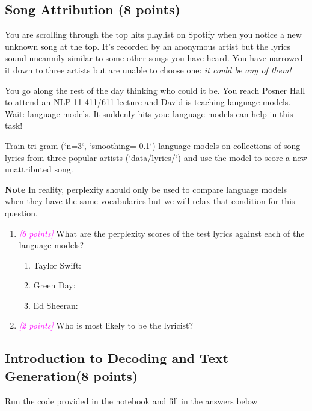 \documentclass{exam}
\newcommand{\grade}[1]{\small\textcolor{magenta}{\emph{[#1 points]}} \normalsize}
\begin{document}
\newpage
\subsection{Song Attribution (8 points)}
You are scrolling through the top hits playlist on Spotify when you notice a new unknown song at the top. It's recorded by an anonymous artist but the lyrics sound uncannily similar to some other songs you have heard. You have narrowed it down to three artists but are unable to choose one: \textit{it could be any of them!}

You go along the rest of the day thinking who could it be. You reach Posner Hall to attend an NLP 11-411/611 lecture and David is teaching language models. Wait: language models. It suddenly hits you: language models can help in this task!

Train tri-gram (`n=3`, `smoothing= 0.1`) language models on collections of song lyrics from three popular artists (`data/lyrics/`) and use the model to score a new unattributed song. 

\textbf{Note} In reality, perplexity should only be used to compare language models when they have the same vocabularies but we will relax that condition for this question.

\begin{enumerate}
    \item \grade{6} What are the perplexity scores of the test lyrics against each of the language models?
    \begin{enumerate}
        \item Taylor Swift:
        
        \item Green Day:
        
        \item Ed Sheeran:
    \end{enumerate}
    
    \item \grade{2} Who is most likely to be the lyricist?
\end{enumerate}

\newpage
\subsection{Introduction to Decoding and Text Generation(8 points)}
Run the code provided in the notebook and fill in the answers below
\end{document}
